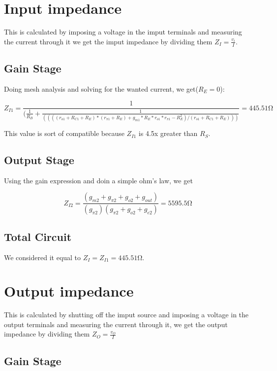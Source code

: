 \section{Input impedance}
This is calculated by imposing a voltage in the imput terminals and measuring the current through it we get the imput impedance by dividing them $Z_{I}=\frac{v_{i}}{I}$.
\subsection{Gain Stage}
Doing mesh analysis and solving for the wanted current, we get($R_E=0$):

\begin{equation}
  Z_{I1} = \frac{1}{(\frac{1}{R_{B}}+\frac{1}{((((r_{o1}+R_{C1}+R_{E})*(r_{\pi1}+R_{E})+g_{m1}*R_{E}*r_{o1}*r_{\pi1} - R_{E}^2)/(r_{o1}+R_{C1}+R_{E})))}}=445.51\si{\ohm}
  \label{eq:imputimpe1}
\end{equation}

This value is sort of compatible because $Z_{I1}$ is 4.5x greater than $R_{S}$.

\subsection{Output Stage}
Using the gain expression and doin a simple ohm's law, we get

\begin{equation}
  Z_{I2} = \frac{(g_{m2}+g_{\pi2}+g_{o2}+g_{out})}{(g_{\pi2})(g_{\pi2}+g_{o2}+g_{e2})}=5595.5\si{\ohm}
  \label{eq:imputimpe2}
\end{equation}

\subsection{Total Circuit}
We considered it equal to $Z_{I}=Z_{I1}=445.51\si{\ohm}$.

\section{Output impedance}
This is calculated by shutting off the imput source and imposing a voltage in the output terminals and measuring the current through it, we get the output impedance by dividing them $Z_{O}=\frac{v_{O}}{I}$

\subsection{Gain Stage}

